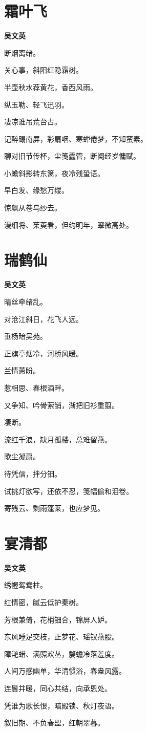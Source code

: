 \documentclass[12pt,a4paper]{ctexbook}
\begin{document}
\section{霜叶飞}
\textbf{吴文英}\par\vspace{0.5em}
断烟离绪。\par
关心事，斜阳红隐霜树。\par
半壶秋水荐黄花，香西风雨。\par
纵玉勒、轻飞迅羽。\par
凄凉谁吊荒台古。\par
记醉蹋南屏，彩扇咽、寒蝉倦梦，不知蛮素。\par
聊对旧节传杯，尘笺蠹管，断阕经岁慵赋。\par
小蟾斜影转东篱，夜冷残蛩语。\par
早白发、缘愁万缕。\par
惊飙从卷乌纱去。\par
漫细将、茱萸看，但约明年，翠微高处。\par

\section{瑞鹤仙}
\textbf{吴文英}\par\vspace{0.5em}
晴丝牵绪乱。\par
对沧江斜日，花飞人远。\par
垂杨暗吴苑。\par
正旗亭烟冷，河桥风暖。\par
兰情蕙盼。\par
惹相思、春根酒畔。\par
又争知、吟骨萦销，渐把旧衫重翦。\par
凄断。\par
流红千浪，缺月孤楼，总难留燕。\par
歌尘凝扇。\par
待凭信，拌分钿。\par
试挑灯欲写，还依不忍，笺幅偷和泪卷。\par
寄残云、剩雨蓬莱，也应梦见。\par

\section{宴清都}
\textbf{吴文英}\par\vspace{0.5em}
绣幄鸳鸯柱。\par
红情密，腻云低护秦树。\par
芳根兼倚，花梢钿合，锦屏人妒。\par
东风睡足交枝，正梦花、瑶钗燕股。\par
障滟蜡、满照欢丛，嫠蟾冷落羞度。\par
人间万感幽单，华清惯浴，春盎风露。\par
连鬟并暖，同心共结，向承恩处。\par
凭谁为歌长恨，暗殿锁、秋灯夜语。\par
叙旧期、不负春盟，红朝翠暮。\par
\end{document}

